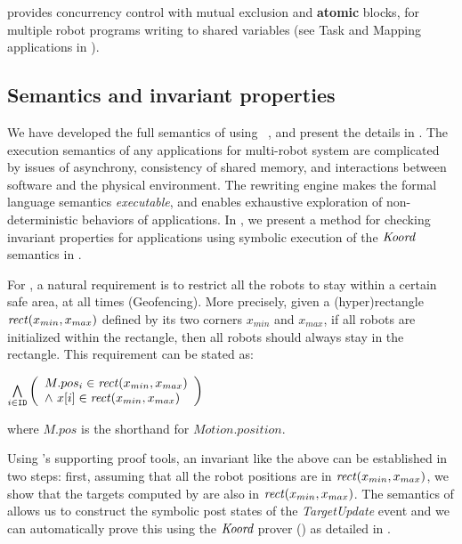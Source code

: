 \lgname provides concurrency control with mutual exclusion and \textbf{atomic} blocks,
for multiple robot programs writing to shared variables (see \textsf{Task} and \textsf{Mapping} applications in ).


\subsection{Semantics and invariant properties}

We have developed the full semantics of \lgname using \K~\cite{rosu-serbanuta-2013-k}, and present the details in .
The execution semantics of any applications for multi-robot system are complicated by issues of asynchrony,
consistency of shared memory, and interactions between software and the physical environment.
The \K rewriting engine makes the formal language semantics \emph{executable},
and enables exhaustive exploration of non-deterministic behaviors of \lgname applications.
In , we present a method for checking invariant properties for \lgname applications using symbolic execution of the $\emph{Koord}$ semantics in \K.

For \LineForm, a natural requirement is to restrict all the robots to stay within a certain safe area, at all times (Geofencing).
More precisely, given a (hyper)rectangle $\mathit{rect}(x_{min}, x_{max})$ defined by its two corners $x_{min}$ and $x_{max}$,
if all robots are initialized within the rectangle, then all robots should always stay in the rectangle.
This requirement can be stated as:
\begin{invariant}
\label{inv:lineform}
\(
\bigwedge\limits_{i \in \texttt{ID}}
    \left(
    \begin{array}{l}
        M.pos_{i} \in \mathit{rect}(x_{min}, x_{max}) \\
        \land\ x[i] \in \mathit{rect}(x_{min}, x_{max})
    \end{array}
    \right)
\)
\end{invariant}
\noindent
where $M.pos$ is the shorthand for $Motion.position$.

Using \lgname's supporting proof tools, an invariant like the above can be established in two steps:
first, assuming that all the robot positions are in $\mathit{rect}(x_{min}, x_{max})$,
we show that the targets computed by \LineForm are also in $\mathit{rect}(x_{min}, x_{max})$.
The \K semantics of \lgname allows us to construct the symbolic post states of the \emph{TargetUpdate} event
and we can automatically prove this using the $\emph{Koord}$ prover () as detailed in .


